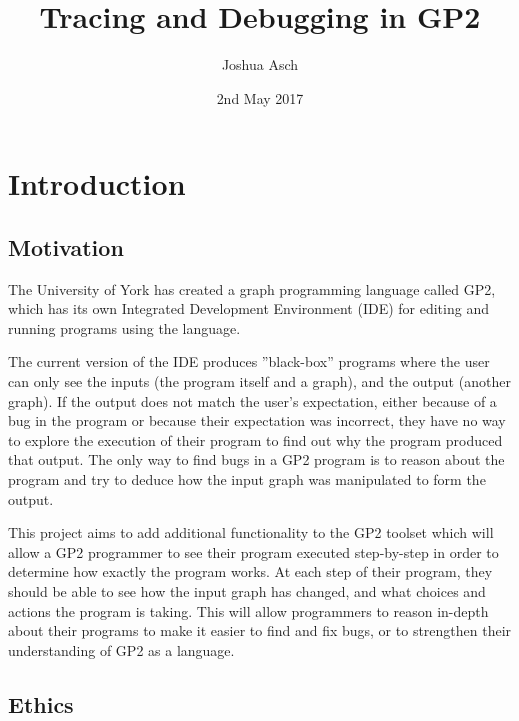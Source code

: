 \documentclass[authoryearcitations]{UoYCSproject}
\author{Joshua Asch}
\title{Tracing and Debugging in GP2}
\date{2nd May 2017}
\begin{document}
\maketitle
\listoffigures
\listoftables

\cleardoublepage


\chapter{Introduction}
\label{cha:Introduction}

\section{Motivation}
\label{sec:Motivation}

The University of York has created a graph programming language called GP2,
which has its own Integrated Development Environment (IDE) for editing and
running programs using the language.

The current version of the IDE produces ''black-box'' programs where the user
can only see the inputs (the program itself and a graph), and the output (another
graph). If the output does not match the user's expectation, either because of
a bug in the program or because their expectation was incorrect, they have no
way to explore the execution of their program to find out why the program
produced that output. The only way to find bugs in a GP2 program is to reason
about the program and try to deduce how the input graph was manipulated to form
the output.

This project aims to add additional functionality to the GP2 toolset which will
allow a GP2 programmer to see their program executed step-by-step in order to
determine how exactly the program works. At each step of their program, they
should be able to see how the input graph has changed, and what choices and
actions the program is taking. This will allow programmers to reason in-depth
about their programs to make it easier to find and fix bugs, or to strengthen
their understanding of GP2 as a language.


\section{Ethics}
\label{sec:Ethics}
\end{document}
